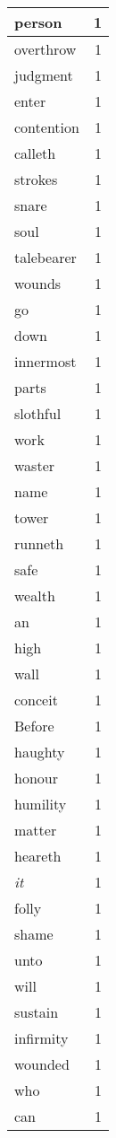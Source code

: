 \begin{center}
\begin{longtable}{l|r}
person & 1\\ \hline 
overthrow & 1\\ \hline 
judgment & 1\\ \hline 
enter & 1\\ \hline 
contention & 1\\ \hline 
calleth & 1\\ \hline 
strokes & 1\\ \hline 
snare & 1\\ \hline 
soul & 1\\ \hline 
talebearer & 1\\ \hline 
wounds & 1\\ \hline 
go & 1\\ \hline 
down & 1\\ \hline 
innermost & 1\\ \hline 
parts & 1\\ \hline 
slothful & 1\\ \hline 
work & 1\\ \hline 
waster & 1\\ \hline 
name & 1\\ \hline 
tower & 1\\ \hline 
runneth & 1\\ \hline 
safe & 1\\ \hline 
wealth & 1\\ \hline 
an & 1\\ \hline 
high & 1\\ \hline 
wall & 1\\ \hline 
conceit & 1\\ \hline 
Before & 1\\ \hline 
haughty & 1\\ \hline 
honour & 1\\ \hline 
humility & 1\\ \hline 
matter & 1\\ \hline 
heareth & 1\\ \hline 
\emph{it} & 1\\ \hline 
folly & 1\\ \hline 
shame & 1\\ \hline 
unto & 1\\ \hline 
will & 1\\ \hline 
sustain & 1\\ \hline 
infirmity & 1\\ \hline 
wounded & 1\\ \hline 
who & 1\\ \hline 
can & 1\\ \hline 

\end{longtable}
\end{center}
